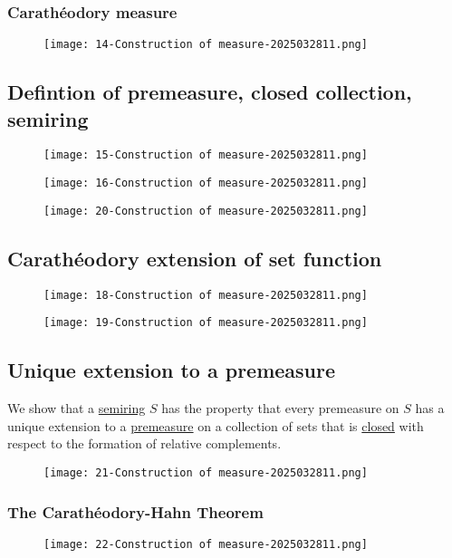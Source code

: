\subsubsection{Carathéodory measure}

\begin{figure}[H]
\centering
\texttt{[image: 14-Construction of measure-2025032811.png]}
\label{}
\end{figure}

\subsection{Defintion of premeasure, closed collection, semiring}

\begin{figure}[H]
\centering
\texttt{[image: 15-Construction of measure-2025032811.png]}
\label{}
\end{figure}
\begin{figure}[H]
\centering
\texttt{[image: 16-Construction of measure-2025032811.png]}
\label{}
\end{figure}
\begin{figure}[H]
\centering
\texttt{[image: 20-Construction of measure-2025032811.png]}
\label{}
\end{figure}

\subsection{Carathéodory extension of set function}

\begin{figure}[H]
\centering
\texttt{[image: 18-Construction of measure-2025032811.png]}
\label{}
\end{figure}
\begin{figure}[H]
\centering
\texttt{[image: 19-Construction of measure-2025032811.png]}
\label{}
\end{figure}

\subsection{Unique extension to a premeasure}

We show that a \underline{semiring} $S$ has the property that every premeasure on $S$ has a unique extension to a \underline{premeasure} on a collection of sets that is \underline{closed} with respect to the formation of relative complements.
\begin{figure}[H]
\centering
\texttt{[image: 21-Construction of measure-2025032811.png]}
\label{}
\end{figure}

\subsubsection{The Carathéodory-Hahn Theorem}

\begin{figure}[H]
\centering
\texttt{[image: 22-Construction of measure-2025032811.png]}
\label{}
\end{figure}
